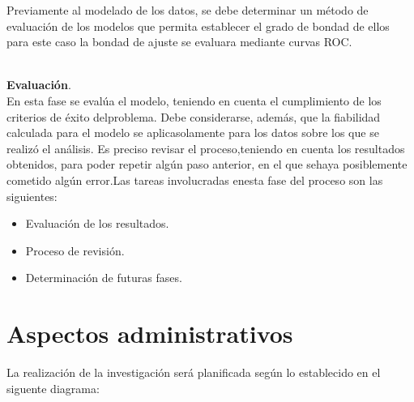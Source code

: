 Previamente al modelado de los datos, se debe determinar un método de evaluación de los modelos que permita establecer el grado de bondad de ellos para este caso la bondad de ajuste se evaluara mediante curvas ROC.\\\

\noindent
\textbf{Evaluación}.\\

	En esta fase se evalúa el modelo, teniendo en cuenta el cumplimiento de los criterios de éxito delproblema. Debe considerarse, además, que la fiabilidad calculada para el modelo se aplicasolamente para los datos sobre los que se realizó el análisis. Es preciso revisar el proceso,teniendo en cuenta los resultados obtenidos, para poder repetir algún paso anterior, en el que sehaya posiblemente cometido algún error.Las tareas involucradas enesta fase del proceso son las siguientes:\\

\begin{itemize}
\item	Evaluación de los resultados.
\item	Proceso de revisión.
\item	Determinación de futuras fases.
\end{itemize}

\section{Aspectos administrativos}

\vspace{1 cm}
La realización de la investigación será planificada según lo establecido en el siguente diagrama:\\

